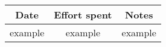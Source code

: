 \documentclass[../main.tex]{subfiles}
\begin{document}
\begin{center}
    \begin{tabular}{|c| |c| |c|} 
        \hline
        Date & Effort spent & Notes\\ [0.5ex] 
        \hline\hline
        example & example & example\\ 
        \hline
    \end{tabular}
\end{center}
\end{document}
